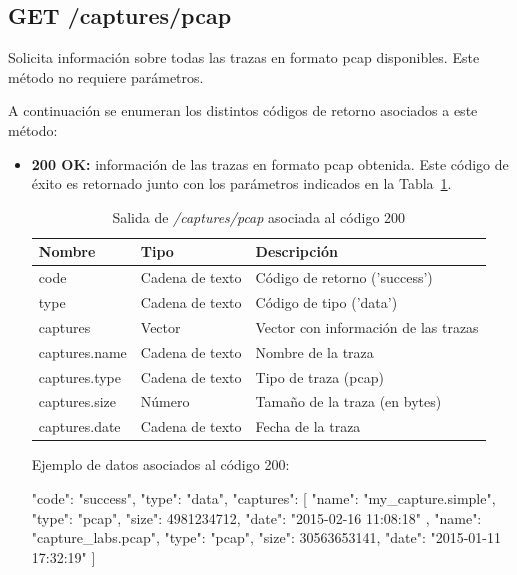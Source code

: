 %
%
\subsection{GET /captures/pcap}
Solicita información sobre todas las \glspl{traza} en formato \gls{pcap} disponibles.
Este método no requiere parámetros.

A continuación se enumeran los distintos códigos de retorno asociados a este método:
\begin{itemize}

\item{\textbf{200 OK:} información de las \glspl{traza} en formato \gls{pcap} obtenida.
Este código de éxito es retornado junto con los parámetros indicados en la Tabla~\ref{extra:api:capturespcap:ok}.
\begin{table}[H]
\centering
\begin{tabular}{|l|l|l|}
\hline
\rowcolor[HTML]{F5F5F5}
\textbf{Nombre}                & \textbf{Tipo}   & \textbf{Descripción}                            \\ \hline
code                           & Cadena de texto & Código de retorno ('success')                   \\ \hline
type                           & Cadena de texto & Código de tipo ('data')                         \\ \hline
captures                       & Vector          & Vector con información de las \glspl{traza}     \\ \hline
captures.name                  & Cadena de texto & Nombre de la \gls{traza}                        \\ \hline
captures.type                  & Cadena de texto & Tipo de \gls{traza} (\gls{pcap})                \\ \hline
captures.size                  & Número          & Tamaño de la \gls{traza} (en bytes)             \\ \hline
captures.date                  & Cadena de texto & Fecha de la \gls{traza}                         \\ \hline
\end{tabular}
\caption{Salida de \textit{/captures/pcap} asociada al código 200}
\label{extra:api:capturespcap:ok}
\end{table}
\begin{minipage}{\textwidth}
Ejemplo de datos asociados al código 200:

\begin{code}[language=json]
{
  "code": "success",
  "type": "data",
  "captures": [
    {
      "name": "my_capture.simple",
      "type": "pcap",
      "size": 4981234712,
      "date": "2015-02-16 11:08:18"
    },
    {
      "name": "capture_labs.pcap",
      "type": "pcap",
      "size": 30563653141,
      "date": "2015-01-11 17:32:19"
    }
  ]
}
\end{code}
\end{minipage}
}

\end{itemize}

